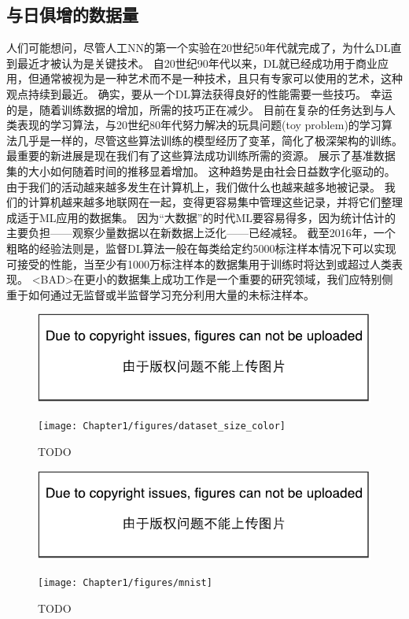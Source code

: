 \subsection{与日俱增的数据量}
\label{sec:increasing_dataset_sizes}
人们可能想问，尽管人工\gls{NN}的第一个实验在20世纪50年代就完成了，为什么\gls{DL}直到最近才被认为是关键技术。
自20世纪90年代以来，\gls{DL}就已经成功用于商业应用，但通常被视为是一种艺术而不是一种技术，且只有专家可以使用的艺术，这种观点持续到最近。
确实，要从一个\gls{DL}算法获得良好的性能需要一些技巧。
幸运的是，随着训练数据的增加，所需的技巧正在减少。
目前在复杂的任务达到与人类表现的学习算法，与20世纪80年代努力解决的玩具问题(toy problem)的学习算法几乎是一样的，尽管这些算法训练的模型经历了变革，简化了极深架构的训练。
最重要的新进展是现在我们有了这些算法成功训练所需的资源。
展示了基准数据集的大小如何随着时间的推移显着增加。
这种趋势是由社会日益数字化驱动的。
由于我们的活动越来越多发生在计算机上，我们做什么也越来越多地被记录。
我们的计算机越来越多地联网在一起，变得更容易集中管理这些记录，并将它们整理成适于\gls{ML}应用的数据集。
因为``大数据''的时代\gls{ML}要容易得多，因为统计估计的主要负担——观察少量数据以在新数据上泛化——已经减轻。
截至2016年，一个粗略的经验法则是，监督\gls{DL}算法一般在每类给定约5000标注样本情况下可以实现可接受的性能，当至少有1000万标注样本的数据集用于训练时将达到或超过人类表现。
<BAD>在更小的数据集上成功工作是一个重要的研究领域，我们应特别侧重于如何通过无监督或半监督学习充分利用大量的未标注样本。
\begin{figure}[!htb]
\ifOpenSource
\centerline{\includegraphics{figure.pdf}}
\else
\centerline{\texttt{[image: Chapter1/figures/dataset\_size\_color]}}
\fi
\caption{TODO}
\label{fig:chap1_dataset_size_color}
\end{figure}
\begin{figure}[!htb]
\ifOpenSource
\centerline{\includegraphics{figure.pdf}}
\else
\centerline{\texttt{[image: Chapter1/figures/mnist]}}
\fi
\caption{TODO}
\label{fig:chap1_mnist}
\end{figure}

